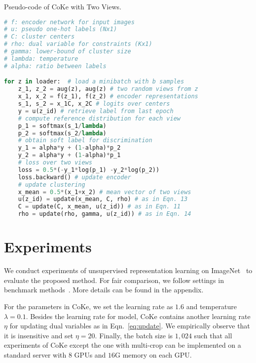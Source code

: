\documentclass[10pt,twocolumn,letterpaper]{article}
\begin{document}
\begin{algorithm}[t]
\caption{Pseudo-code of CoKe with Two Views.}
\label{alg:code}
\begin{lstlisting}[language=python]
# f: encoder network for input images
# u: pseudo one-hot labels (Nx1)
# C: cluster centers
# rho: dual variable for constraints (Kx1)
# gamma: lower-bound of cluster size
# lambda: temperature
# alpha: ratio between labels

for z in loader:  # load a minibatch with b samples
    z_1, z_2 = aug(z), aug(z) # two random views from z
    x_1, x_2 = f(z_1), f(z_2) # encoder representations
    s_1, s_2 = x_1C, x_2C # logits over centers
    y = u(z_id) # retrieve label from last epoch
    # compute reference distribution for each view
    p_1 = softmax(s_1/lambda)
    p_2 = softmax(s_2/lambda)
    # obtain soft label for discrimination
    y_1 = alpha*y + (1-alpha)*p_2 
    y_2 = alpha*y + (1-alpha)*p_1
    # loss over two views
    loss = 0.5*(-y_1*log(p_1) -y_2*log(p_2)) 
    loss.backward() # update encoder
    # update clustering
    x_mean = 0.5*(x_1+x_2) # mean vector of two views
    u(z_id) = update(x_mean, C, rho) # as in Eqn. 13
    C = update(C, x_mean, u(z_id)) # as in Eqn. 11
    rho = update(rho, gamma, u(z_id)) # as in Eqn. 14
\end{lstlisting}
\end{algorithm}


\section{Experiments}\label{sec:exp}
We conduct experiments of unsupervised representation learning on ImageNet~\cite{RussakovskyDSKS15} to evaluate the proposed method. For fair comparison, we follow settings in benchmark methods~\cite{CaronMMGBJ20,ChenK0H20,abs-2003-04297}. More details can be found in the appendix. 

For the parameters in CoKe, we set the learning rate as $1.6$ and temperature $\lambda=0.1$. Besides the learning rate for model, CoKe contains another learning rate $\eta$ for updating dual variables as in Eqn.~\ref{eq:update}. We empirically observe that it is insensitive and set $\eta=20$. Finally, the batch size is $1,024$ such that all experiments of CoKe except the one with multi-crop can be implemented on a standard server with $8$ GPUs and $16$G memory on each GPU.
\end{document}
